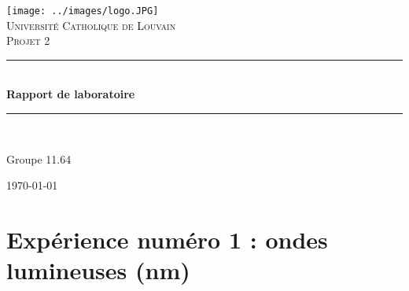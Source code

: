 \documentclass[a4paper,11pt]{article}
\begin{document}

\newcommand{\HRule}{\rule{\linewidth}{0.5mm}}

\fancyhf{} %
\fancyhead[R]{\thepage} %


\pagestyle{fancy}
\thispagestyle{empty}
\begin{titlepage}
\begin{center}

\texttt{[image: ../images/logo.JPG]}~\\[1cm]

\textsc{\LARGE Université Catholique de Louvain}\\[1.5cm]

\textsc{\Large Projet 2}\\[0.5cm]

\HRule \\[0.4cm]
{ \huge \bfseries Rapport de laboratoire \\[0.4cm] }

\HRule \\[1.5cm]

\begin{minipage}{0.4\textwidth}
\begin{flushleft} \large
Groupe \textsc{11.64} \\

\end{flushleft}
\end{minipage}
\begin{minipage}{0.4\textwidth}
\begin{flushright} \large
\end{flushright}
\end{minipage}

\vfill

{\large \today}
\end{center}
\end{titlepage}
\tableofcontents
\section{Expérience numéro 1 : ondes lumineuses (nm)}
\end{document}
